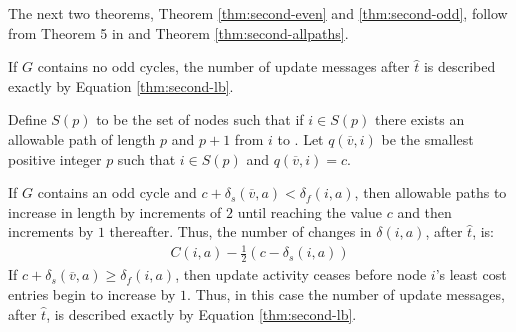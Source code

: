 {{The next two theorems, Theorem \ref{thm:second-even} and \ref{thm:second-odd}, follow from Theorem 5 in \cite{Johnson84} and Theorem \ref{thm:second-allpaths}.

\begin{theorem}
\label{thm:second-even}
If $G$ contains no odd cycles, the number of update messages after $\hat{t}$ is described exactly by Equation \ref{thm:second-lb}.
\end{theorem}

Define $S(p)$ to be the set of nodes such that if $i \in S(p)$ there exists an allowable path of length $p$ and $p+1$ from $i$ to \bads. 
Let $q(\overline{v},i)$ be the smallest positive integer $p$ such that $i \in S(p)$ and $q(\overline{v},i)=c$.

\begin{theorem}
\label{thm:second-odd}
If $G$ contains an odd cycle and $c + \delta_s(\overline{v},a) < \delta_f(i,a)$, then allowable paths to \bad increase in length by increments of $2$ until reaching the 
value $c$ and then increments by $1$ thereafter.  Thus, the number of changes in $\delta(i,a)$, after $\hat{t}$, is:
\begin{eqnarray}
C(i,a) - \frac{1}{2} \displaystyle \left(c - \delta_s(i,a)\right)
\end{eqnarray}
If $c + \delta_s(\overline{v},a) \geq \delta_f(i,a)$, then update activity ceases before node $i$'s least cost entries begin to increase by $1$.  Thus, in this case the number of update messages, after $\hat{t}$, is
described exactly by Equation \ref{thm:second-lb}.
\end{theorem}


}}
